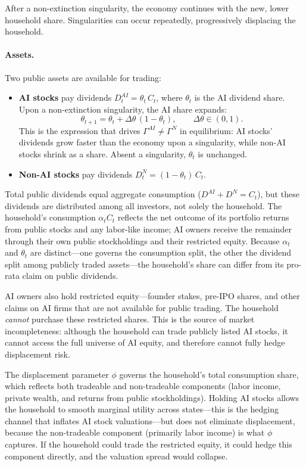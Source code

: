 \documentclass[12pt]{article}
\begin{document}
\noindent After a non-extinction singularity, the economy continues with the new, lower household share. Singularities can occur repeatedly, progressively displacing the household.

\paragraph{Assets.}
Two public assets are available for trading:
%
\begin{itemize}
\item \textbf{AI stocks} pay dividends $D_t^{AI} = \theta_t \, C_t$, where $\theta_t$ is the AI dividend share. Upon a non-extinction singularity, the AI share expands:
%
\begin{equation}
\theta_{t+1} = \theta_t + \Delta\theta \, (1 - \theta_t), \qquad \Delta\theta \in (0,1). \label{eq:theta-update}
\end{equation}
%
This is the expression that drives $\Gamma^{AI} \neq \Gamma^{N}$ in equilibrium: AI stocks' dividends grow faster than the economy upon a singularity, while non-AI stocks shrink as a share. Absent a singularity, $\theta_t$ is unchanged.
\item \textbf{Non-AI stocks} pay dividends $D_t^{N} = (1 - \theta_t) \, C_t$.
\end{itemize}

\noindent Total public dividends equal aggregate consumption ($D^{AI} + D^{N} = C_t$), but these dividends are distributed among all investors, not solely the household. The household's consumption $\alpha_t C_t$ reflects the net outcome of its portfolio returns from public stocks and any labor-like income; AI owners receive the remainder through their own public stockholdings and their restricted equity. Because $\alpha_t$ and $\theta_t$ are distinct---one governs the consumption split, the other the dividend split among publicly traded assets---the household's share can differ from its pro-rata claim on public dividends.

AI owners also hold restricted equity---founder stakes, pre-IPO shares, and other claims on AI firms that are not available for public trading. The household \emph{cannot} purchase these restricted shares. This is the source of market incompleteness: although the household can trade publicly listed AI stocks, it cannot access the full universe of AI equity, and therefore cannot fully hedge displacement risk.

The displacement parameter $\phi$ governs the household's total consumption share, which reflects both tradeable and non-tradeable components (labor income, private wealth, and returns from public stockholdings). Holding AI stocks allows the household to smooth marginal utility across states---this is the hedging channel that inflates AI stock valuations---but does not eliminate displacement, because the non-tradeable component (primarily labor income) is what $\phi$ captures. If the household could trade the restricted equity, it could hedge this component directly, and the valuation spread would collapse.
\end{document}

